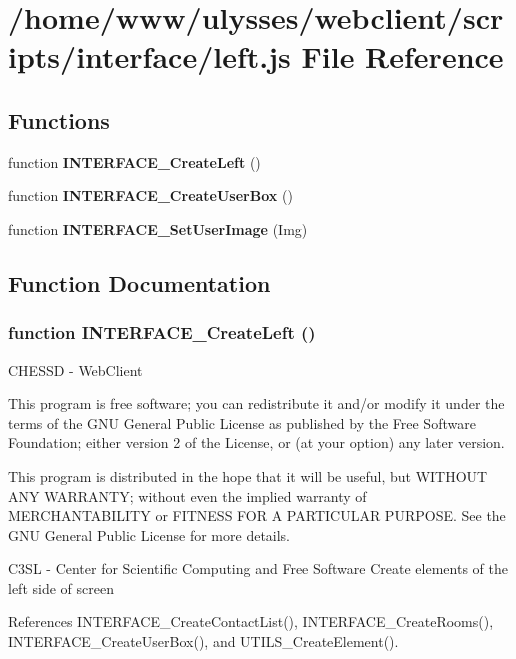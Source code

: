 \section{/home/www/ulysses/webclient/scripts/interface/left.js File Reference}
\label{left_8js}
\subsection*{Functions}
\begin{CompactItemize}
\item 
function {\bf INTERFACE\_\-CreateLeft} ()
\item 
function {\bf INTERFACE\_\-CreateUserBox} ()
\item 
function {\bf INTERFACE\_\-SetUserImage} (Img)
\end{CompactItemize}


\subsection{Function Documentation}
\subsubsection{\setlength{\rightskip}{0pt plus 5cm}function INTERFACE\_\-CreateLeft ()}\label{left_8js_6773b1f1613b8bf92b8443e4451130d8}


CHESSD - WebClient

This program is free software; you can redistribute it and/or modify it under the terms of the GNU General Public License as published by the Free Software Foundation; either version 2 of the License, or (at your option) any later version.

This program is distributed in the hope that it will be useful, but WITHOUT ANY WARRANTY; without even the implied warranty of MERCHANTABILITY or FITNESS FOR A PARTICULAR PURPOSE. See the GNU General Public License for more details.

C3SL - Center for Scientific Computing and Free Software Create elements of the left side of screen 

References INTERFACE\_\-CreateContactList(), INTERFACE\_\-CreateRooms(), INTERFACE\_\-CreateUserBox(), and UTILS\_\-CreateElement().

